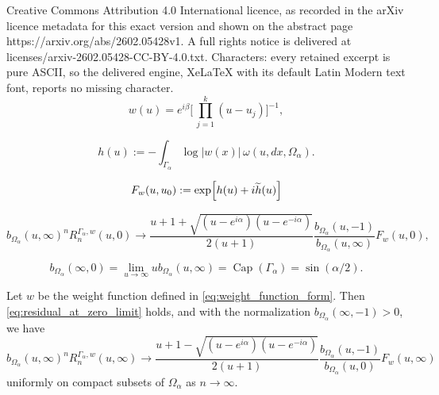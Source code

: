 \documentclass[10pt,a4paper]{amsart}
\renewcommand{\Cap}{\operatorname{Cap}}
\begin{document}
Creative Commons Attribution 4.0 International licence, as recorded in the arXiv licence metadata for this exact version and shown on the abstract page https://arxiv.org/abs/2602.05428v1. A full rights notice is delivered at licenses/arxiv-2602.05428-CC-BY-4.0.txt. Characters: every retained excerpt is pure ASCII, so the delivered engine, XeLaTeX with its default Latin Modern text font, reports no missing character.
\begin{equation}
	w(u) = e^{i\beta}\Biggl[\,\prod_{j=1}^{k}(u-u_j)\Biggr]^{-1},
	\label{eq:weight_function_form}
\end{equation}

\begin{equation}
\label{hw}
   h(u) := -\int_{\Gamma_\alpha}\log |w(x)|\,\omega(u,dx,\Omega_{\alpha}).
\end{equation}

\begin{equation}
\label{eq:outer_function}
   F_w(u, u_0) := \exp \Bigl[ h(u)+i \widetilde{h}(u) \Bigr]
\end{equation}

\begin{equation}
\label{eq:residual_at_zero_limit}
   b_{\Omega_\alpha}(u,\infty)^n R_{n}^{\Gamma_\alpha,w}(u,0) \longrightarrow  
   \frac{u+1+\sqrt{(u-e^{i\alpha})(u-e^{-i\alpha})}}{2(u+1)}
   \frac{b_{\Omega_\alpha}(u, -1)}{b_{\Omega_\alpha}(u,\infty)} F_w(u, 0),
\end{equation}

\begin{equation}
\label{ca}
   b_{\Omega_\alpha}(\infty, 0) = \lim_{u\to\infty} ub_{\Omega_\alpha}(u, \infty) =  
   \Cap(\Gamma_\alpha)=\sin(\alpha/2).
\end{equation}    

\begin{proposition}
Let $w$ be the weight function defined in \eqref{eq:weight_function_form}. Then \eqref{eq:residual_at_zero_limit} holds, and with the normalization $b_{\Omega_\alpha}(\infty,-1)>0$, we have
\begin{equation}
	b_{\Omega_{\alpha}}(u,\infty)^nR_{n}^{\Gamma_\alpha,w}(u,\infty)\longrightarrow 
	\frac{u+1-\sqrt{(u-e^{i\alpha})(u-e^{-i\alpha})}}{2(u+1)}
	\frac{b_{\Omega_\alpha}(u,-1)}{b_{\Omega_\alpha}(u,0)}F_w(u,\infty)
	\label{eq:residual_at_infinity_limit}
\end{equation}
uniformly on compact subsets of $\Omega_\alpha$ as $n\rightarrow \infty$.
\end{proposition}
\end{document}
